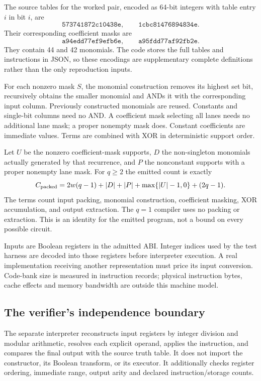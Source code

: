 \documentclass[11pt,letterpaper]{article}
\theoremstyle{definition}\newtheorem{definition}[theorem]{Definition}
\theoremstyle{remark}\newtheorem{remark}[theorem]{Remark}
\begin{document}
The source tables for the worked pair, encoded as 64-bit integers with table entry $i$ in bit $i$, are
\begin{equation}
 \mathtt{573741872c10438e},\qquad \mathtt{1cbc81476894834e}.
\end{equation}
Their corresponding coefficient masks are
\begin{equation}
 \mathtt{a94edd77ef9efb6e},\qquad \mathtt{a95fdd77af92fb2e}.
\end{equation}
They contain 44 and 42 monomials. The code stores the full tables and instructions in JSON, so these encodings are supplementary complete definitions rather than the only reproduction inputs.

For each nonzero mask $S$, the monomial construction removes its highest set bit, recursively obtains the smaller monomial and ANDs it with the corresponding input column. Previously constructed monomials are reused. Constants and single-bit columns need no AND. A coefficient mask selecting all lanes needs no additional lane mask; a proper nonempty mask does. Constant coefficients are immediate values. Terms are combined with XOR in deterministic support order.

Let $U$ be the nonzero coefficient-mask supports, $D$ the non-singleton monomials actually generated by that recurrence, and $P$ the nonconstant supports with a proper nonempty lane mask. For $q\ge2$ the emitted count is exactly
\begin{equation}
 C_{\rm packed}=2w(q-1)+|D|+|P|+\max\{|U|-1,0\}+(2q-1).
 \label{eq:count}
\end{equation}
The terms count input packing, monomial construction, coefficient masking, XOR accumulation, and output extraction. The $q=1$ compiler uses no packing or extraction. This is an identity for the emitted program, not a bound on every possible circuit.

Inputs are Boolean registers in the admitted ABI. Integer indices used by the test harness are decoded into those registers before interpreter execution. A real implementation receiving another representation must price its input conversion. Code-bank size is measured in instruction records; physical instruction bytes, cache effects and memory bandwidth are outside this machine model.

\subsection{The verifier's independence boundary}
The separate interpreter reconstructs input registers by integer division and modular arithmetic, resolves each explicit operand, applies the instruction, and compares the final output with the source truth table. It does not import the constructor, its Boolean transform, or its executor. It additionally checks register ordering, immediate range, output arity and declared instruction/storage counts.
\end{document}
